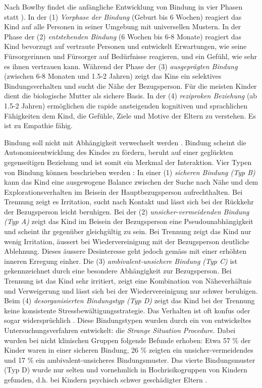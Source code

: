 Nach Bowlby findet die anfängliche Entwicklung von Bindung in vier Phasen statt \cite{Siegler2008}). In der (1) \textit{Vorphase der Bindung} (Geburt bis 6 Wochen) reagiert das Kind auf alle Personen in seiner Umgebung mit universellen Mustern. In der Phase der (2) \textit{entstehenden Bindung} (6 Wochen bis 6-8 Monate) reagiert das Kind bevorzugt auf vertraute Personen und entwickelt Erwartungen, wie seine Fürsorgerinnen und Fürsorger auf Bedürfnisse reagieren, und ein Gefühl, wie sehr es ihnen vertrauen kann. Während der Phase der (3) \textit{ausgeprägten Bindung} (zwischen 6-8 Monaten und 1.5-2 Jahren) zeigt das Kins ein selektives Bindungsverhalten und sucht die Nähe der Bezugsperson. Für die meisten Kinder dient die biologische Mutter als sichere Basis. In der (4) \textit{reziproken Beziehung} (ab 1.5-2 Jahren) ermöglichen die rapide ansteigenden kognitiven und sprachlichen Fähigkeiten dem Kind, die Gefühle, Ziele und Motive der Eltern zu verstehen. Es ist zu Empathie fähig.

Bindung soll nicht mit Abhängigkeit verwechselt werden \cite{Schmidt1996}. Bindung scheint die Autonomieentwicklung des Kindes zu fördern, beruht auf einer geglückten gegenseitigen Beziehung und ist somit ein Merkmal der Interaktion. Vier Typen von Bindung können beschrieben werden \cite[S.~100 ff.]{Resch1999}: In einer (1) \textit{sicheren Bindung (Typ B)} kann das Kind eine ausgewogene Balance zwischen der Suche nach Nähe und dem Explorationsverhalten im Beisein der Hauptbezugsperson aufrechthalten. Bei Trennung zeigt es Irritation, sucht nach Kontakt und lässt sich bei der Rückkehr der Bezugsperson leicht beruhigen. Bei der (2) \textit{unsicher-vermeidenden Bindung (Typ A)} zeigt das Kind im Beisein der Bezugsperson eine Pseudounabhängigkeit und scheint ihr gegenüber gleichgültig zu sein. Bei Trennung zeigt das Kind nur wenig Irritation, äussert bei Wiedervereinigung mit der Bezugsperson deutliche Ablehnung. Dieses äussere Desinteresse geht jedoch gemäss  mit einer erhöhten inneren Erregung einher. Die (3) \textit{ambivalent-unsichere Bindung (Typ C)} ist gekennzeichnet durch eine besondere Abhängigkeit zur Bezugsperson. Bei Trennung ist das Kind sehr irritiert, zeigt eine Kombination von Näheverhältnis und Verweigerung und lässt sich bei der Wiedervereinigung nur schwer beruhigen. Beim (4) \textit{desorganisierten Bindungstyp (Typ D)} zeigt das Kind bei der Trennung keine konsistente Stressbewältigungsstrategie. Das Verhalten ist oft konfus oder sogar widersprüchlich \cite{Siegler2008}. Diese Bindungstypen wurden durch ein von  entwickeltes Untersuchungsverfahren entwickelt: die \textit{Strange Situation Procedure}. Dabei wurden bei nicht klinischen Gruppen folgende Befunde erhoben: Etwa 57 \% der Kinder waren in einer sicheren Bindung, 26 \% zeigten ein unsicher-vermeidendes und 17 \% ein ambivalent-unsicheres Bindungsmuster. Das vierte Bindungsmuster (Typ D) wurde nur selten und vornehmlich in Hochrisikogruppen von Kindern gefunden, d.h. bei Kindern psychisch schwer geschädigter Eltern \cite[S.~101]{Resch1999}.

